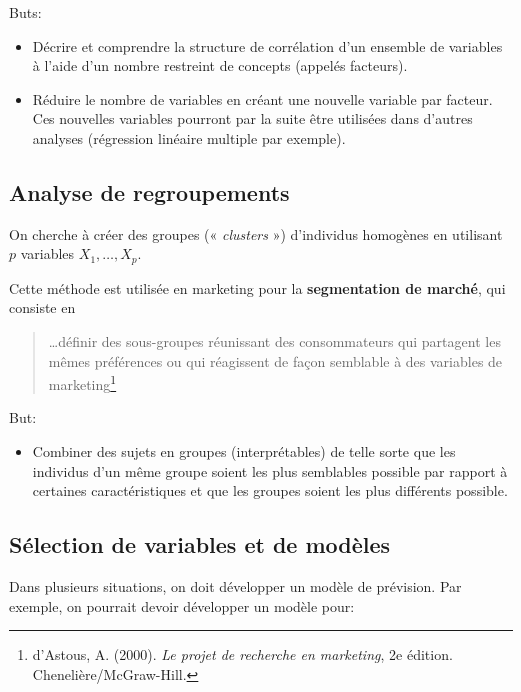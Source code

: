 \documentclass[
  11pt,
  letterpaper,
]{scrbook}
\providecommand{\tightlist}{%
  \setlength{\itemsep}{0pt}\setlength{\parskip}{0pt}}\usepackage{longtable,booktabs,array}
\theoremstyle{definition}
\theoremstyle{remark}
\begin{document}
Buts:

\begin{itemize}
\tightlist
\item
  Décrire et comprendre la structure de corrélation d'un ensemble de
  variables à l'aide d'un nombre restreint de concepts (appelés
  facteurs).
\item
  Réduire le nombre de variables en créant une nouvelle variable par
  facteur. Ces nouvelles variables pourront par la suite être utilisées
  dans d'autres analyses (régression linéaire multiple par exemple).
\end{itemize}

\hypertarget{analyse-de-regroupements}{%
\subsection{Analyse de regroupements}\label{analyse-de-regroupements}}

On cherche à créer des groupes (« \emph{clusters} ») d'individus
homogènes en utilisant \(p\) variables \(X_1, \ldots, X_p\).

Cette méthode est utilisée en marketing pour la \textbf{segmentation de
marché}, qui consiste en

\begin{quote}
\ldots définir des sous-groupes réunissant des consommateurs qui
partagent les mêmes préférences ou qui réagissent de façon semblable à
des variables de marketing\footnote{d'Astous, A. (2000). \emph{Le projet
  de recherche en marketing}, 2e édition. Chenelière/McGraw-Hill.}
\end{quote}

But:

\begin{itemize}
\tightlist
\item
  Combiner des sujets en groupes (interprétables) de telle sorte que les
  individus d'un même groupe soient les plus semblables possible par
  rapport à certaines caractéristiques et que les groupes soient les
  plus différents possible.
\end{itemize}

\hypertarget{suxe9lection-de-variables-et-de-moduxe8les}{%
\subsection{Sélection de variables et de
modèles}\label{suxe9lection-de-variables-et-de-moduxe8les}}

Dans plusieurs situations, on doit développer un modèle de prévision.
Par exemple, on pourrait devoir développer un modèle pour:
\end{document}
